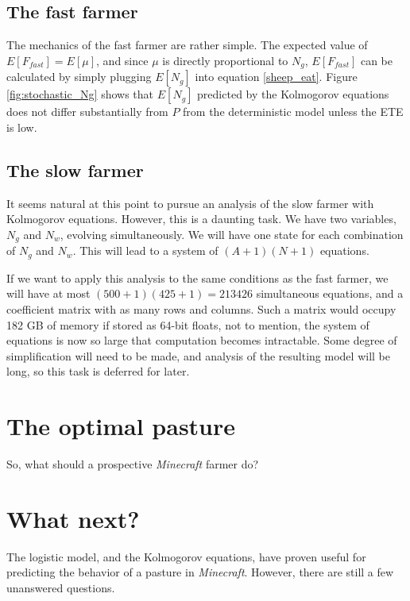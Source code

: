\documentclass{article}
\theoremstyle{theorem}
\theoremstyle{definition}
\begin{document}
\subsection{The fast farmer}

The mechanics of the fast farmer are rather simple. The expected value of $E[F_{fast}]=E[\mu]$, and since $\mu$ is directly proportional to $N_g$, $E[F_{fast}]$ can be calculated by simply plugging $E[N_g]$ into equation \ref{sheep_eat}. Figure \ref{fig:stochastic_Ng} shows that $E[N_g]$ predicted by the Kolmogorov equations does not differ substantially from $P$ from the deterministic model unless the ETE is low.

\subsection{The slow farmer}

It seems natural at this point to pursue an analysis of the slow farmer with Kolmogorov equations. However, this is a daunting task. We have two variables, $N_g$ and $N_w$, evolving simultaneously. We will have one state for each combination of $N_g$ and $N_w$. This will lead to a system of $(A+1)(N+1)$ equations.

If we want to apply this analysis to the same conditions as the fast farmer, we will have at most $(500+1)(425+1)=213426$ simultaneous equations, and a coefficient matrix with as many rows and columns. Such a matrix would occupy 182 GB of memory if stored as 64-bit floats, not to mention, the system of equations is now so large that computation becomes intractable. Some degree of simplification will need to be made, and analysis of the resulting model will be long, so this task is deferred for later.

\section{The optimal pasture}

So, what should a prospective \textit{Minecraft} farmer do? 

\section{What next?}

The logistic model, and the Kolmogorov equations, have proven useful for predicting the behavior of a pasture in \textit{Minecraft}. However, there are still a few unanswered questions.
\end{document}
